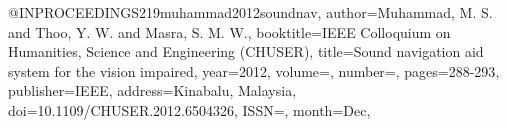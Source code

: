 @INPROCEEDINGS{219muhammad2012soundnav,
author={Muhammad, M. S. and Thoo, Y. W. and Masra, S. M. W.},
booktitle={IEEE Colloquium on Humanities, Science and Engineering (CHUSER)}, 
title={Sound navigation aid system for the vision impaired}, 
year={2012},
volume={},
number={},
pages={288-293},
publisher={IEEE},
address={Kinabalu, Malaysia},
doi={10.1109/CHUSER.2012.6504326},
ISSN={},
month={Dec},}